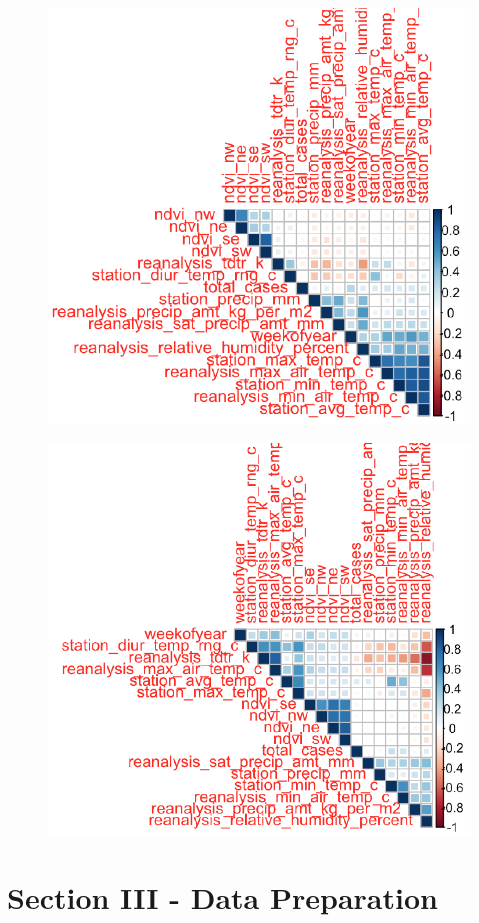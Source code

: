 \documentclass[floatsintext,man]{apa6}
\theoremstyle{definition}
\theoremstyle{definition}
\theoremstyle{definition}
\theoremstyle{remark}
\begin{document}
\begin{figure}[!h]
\includegraphics[width=0.5\linewidth]{Final_report_files/figure-latex/unnamed-chunk-4-1} \caption{ }\label{fig:unnamed-chunk-4}
\end{figure}\begin{figure}[!h]
\includegraphics[width=\textwidth]{Final_report_files/figure-latex/unnamed-chunk-5-1} \caption{ }\label{fig:unnamed-chunk-5}
\end{figure}

\newpage

\section{Section III - Data
Preparation}\label{section-iii---data-preparation}
\end{document}

